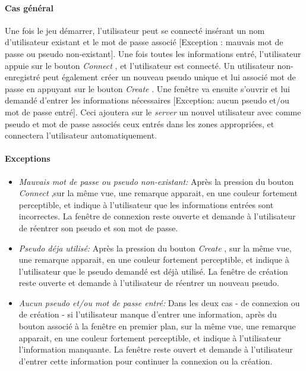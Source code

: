 \documentclass[a4paper,11pt]{report}
\begin{document}
\paragraph{Cas général}
Une fois le jeu démarrer, l'utilisateur peut se connecté insérant un nom d'utilisateur existant et le mot de passe associé
[Exception : mauvais mot de passe ou pseudo non-existant].
Une fois toutes les informations entré, l'utilisateur appuie sur le bouton \og \textit{Connect} \fg, et l'utilisateur est
connecté. Un utilisateur non-enregistré peut également créer un nouveau pseudo unique
et lui associé mot de passe en appuyant sur le bouton \og \textit{Create} .
Une fenêtre va ensuite s'ouvrir et lui demandé d'entrer les informations nécessaires 
[Exception: aucun pseudo et/ou mot de passe entré]. Ceci ajoutera sur le \textit{server} un nouvel utilisateur avec comme
pseudo et mot de passe associés ceux entrés dans les zones appropriées, et connectera l'utilisateur automatiquement.
\paragraph{Exceptions}
\begin{itemize}
 \item \textit{Mauvais mot de passe ou pseudo non-existant:} Après la pression du bouton \og \textit{Connect} \fg
 ,sur la même vue, une remarque apparait, en une couleur fortement
 perceptible, et indique à l'utilisateur que les informations entrées sont incorrectes. La fenêtre de connexion reste ouverte et
 demande à l'utilisateur de réentrer son pseudo et son mot de passe.
 \item \textit{Pseudo déja utilisé:} Après la pression du bouton \og \textit{Create} \fg,
 sur la même vue, une remarque apparait, en une couleur fortement
 perceptible, et indique à l'utilisateur que le pseudo demandé est déjà utilisé. La fenêtre de création reste ouverte
 et demande à l'utilisateur de réentrer un nouveau pseudo.
 \item \textit{Aucun pseudo et/ou mot de passe entré:} Dans les deux cas - de connexion ou de création - si l'utilisateur
 manque d'entrer une information, après du bouton associé à la fenêtre en premier plan, sur la même vue,
 une remarque apparait, en une couleur fortement perceptible, et indique à l'utilisateur l'information manquante. La
 fenêtre reste ouvert et demande à l'utilisateur d'entrer cette information pour continuer la connexion ou la création.
\end{itemize}
\end{document}
